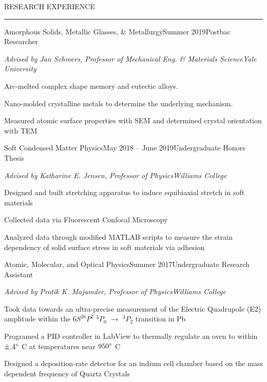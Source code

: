 \documentclass{resume} %
\renewenvironment{rSection}[1]{
	\sectionskip
	\textcolor{RoyalPurple}{\MakeUppercase{#1}}
	\sectionlineskip
	\hrule
	\begin{list}{}{
			\setlength{\leftmargin}{1.5em}
		}
		\item[]
	}{
	\end{list}
}
\begin{document}
\vspace{-1em}
	\begin{rSection}{Research Experience}
		\begin{rSubsection}{Amorphous Solids, Metallic Glasses, \& Metallurgy}{Summer 2019}{Postbac Researcher}{}
			\vspace{-.5em}
			\item[] {\em Advised by Jan Schroers, Professor of Mechanical Eng. \& Materials Science}\hfill {\em Yale University}
			\item Arc-melted complex shape memory and eutectic alloys.
			\item Nano-molded crystalline metals to determine the underlying mechanism.
			\item Measured atomic surface properties with SEM and determined crystal orientation with TEM
		\end{rSubsection}


		\begin{rSubsection}{Soft Condensed Matter Physics}{May 2018 -- June 2019}{Undergraduate Honors Thesis}{}
			\vspace{-.5em}
				\item[] {\em Advised by Katharine E. Jensen, Professor of Physics}\hfill {\em Williams College}
				\item Designed and built stretching apparatus to induce equibiaxial stretch in soft materials
				\item Collected data via Fluorescent Confocal Microscopy 
				\item Analyzed data through modified MATLAB scripts to measure the strain dependency of solid surface stress in soft materials via adhesion

		\end{rSubsection}

		\pagebreak

		\begin{rSubsection}{Atomic, Molecular, and Optical Physics}{Summer 2017}{Undergraduate Research Assistant}{}
			\vspace{-.5em}
			\item[] {\em Advised by Protik K. Majumder, Professor of Physics}\hfill {\em Williams College}
			\item Took data towards an ultra-precise  measurement of the Electric Quadrupole (E2) amplitude within the $6S^26P^2$ $^3P_0$ $\rightarrow$ $^3P_2$ transition in Pb
			\item Programed a PID controller in LabView to thermally regulate an oven to within $\pm .4\degree$ C at temperatures near $ 950\degree $ C
			\item Designed a deposition-rate detector for an indium cell chamber based on the mass dependent frequency of Quartz Crystals
		\end{rSubsection}

\end{rSection}
\end{document}
